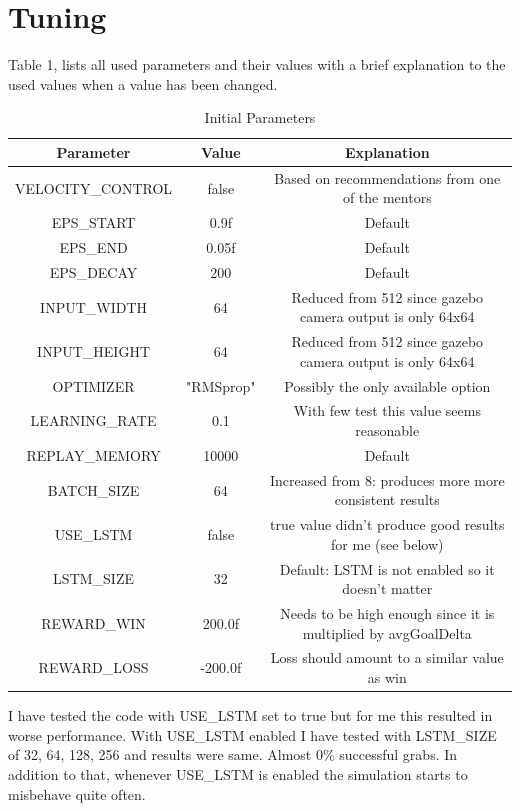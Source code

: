 \documentclass{article}
\begin{document}
\section{Tuning}

Table 1, lists all used parameters and their values with a brief explanation to the used values when a value has been changed.

\begin{table}[!ht]
\caption{Initial Parameters}
\label{initial_params}
\begin{center}
\begin{tabular}{|c||c||c|}
\hline
Parameter & Value & Explanation\\
\hline
VELOCITY\_CONTROL & false & Based on recommendations from one of the mentors \\
\hline
EPS\_START & 0.9f & Default \\
\hline
EPS\_END & 0.05f & Default \\
\hline
EPS\_DECAY & 200 & Default \\
\hline
INPUT\_WIDTH & 64 & Reduced from 512 since gazebo camera output is only 64x64 \\
\hline
INPUT\_HEIGHT & 64 & Reduced from 512 since gazebo camera output is only 64x64 \\
\hline
OPTIMIZER & "RMSprop" & Possibly the only available option \\
\hline
LEARNING\_RATE & 0.1 & With few test this value seems reasonable \\
\hline
REPLAY\_MEMORY & 10000 & Default \\
\hline
BATCH\_SIZE & 64 & Increased from 8: produces more more consistent results \\
\hline
USE\_LSTM & false & true value didn't produce good results for me (see below) \\
\hline
LSTM\_SIZE & 32 & Default: LSTM is not enabled so it doesn't matter \\
\hline
REWARD\_WIN  & 200.0f & Needs to be high enough since it is multiplied by avgGoalDelta \\
\hline
REWARD\_LOSS & -200.0f & Loss should amount to a similar value as win \\
\hline
\end{tabular}
\end{center}
\end{table}

I have tested the code with USE\_LSTM set to true but for me this resulted in worse performance. With USE\_LSTM enabled I have tested with LSTM\_SIZE of 32, 64, 128, 256 and results were same. Almost 0\% successful grabs. In addition to that, whenever USE\_LSTM is enabled the simulation starts to misbehave quite often.
\end{document}
